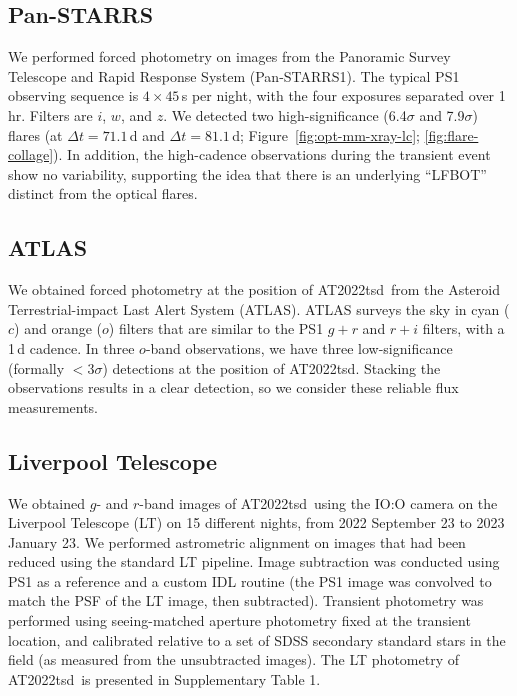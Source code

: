 \documentclass{nature_plusfigure}
\newcommand{\at}{AT2022tsd}
\begin{document}
\begin{methods}
\subsection{Pan-STARRS}
\label{sec:panstarrs}

We performed forced photometry on images from the Panoramic Survey Telescope and Rapid Response System (Pan-STARRS1\cite{Tonry2012,Chambers2016,Flewelling2020}).
The typical PS1 observing sequence is $4\times45$\,s per night, with the
four exposures separated over 1\,hr. Filters are $i$, $w$, and $z$\cite{Tonry2012}.
We detected two high-significance (6.4$\sigma$ and 7.9$\sigma$) flares (at $\Delta t=71.1$\,d and $\Delta t=81.1\,$d; Figure~\ref{fig:opt-mm-xray-lc}; \ref{fig:flare-collage}).
In addition, the high-cadence observations during the transient event show no variability, supporting the idea that there is an underlying ``LFBOT'' distinct from the optical flares.

\subsection{ATLAS}
\label{sec:atlas}

We obtained forced photometry at the position of \at\ from the Asteroid Terrestrial-impact Last Alert System (ATLAS\cite{Tonry2018,Smith2020,Shingles2021}).
ATLAS surveys the sky in cyan ($c$) and orange ($o$) filters that are similar to the PS1 $g+r$ and $r+i$ filters,
with a 1\,d cadence.
In three $o$-band observations, we have three low-significance (formally $<3\sigma$) detections at the position of \at.
Stacking the observations results in a clear detection, so we consider these reliable flux measurements.

\subsection{Liverpool Telescope}
\label{Methods: LT}

We obtained $g$- and $r$-band images of \at\ using the IO:O camera on the Liverpool Telescope\cite{Steele2004} (LT) on 15 different nights, from 2022 September 23 to 2023 January 23. We performed astrometric alignment on images that had been reduced using the standard LT pipeline.  Image subtraction was conducted using PS1 as a reference and a custom IDL routine (the PS1 image was convolved to match the PSF of the LT image, then subtracted).  Transient photometry was performed using seeing-matched aperture photometry fixed at the transient location, and calibrated relative to a set of SDSS secondary standard stars in the field (as measured from the unsubtracted images). The LT photometry of \at\ is presented in Supplementary Table 1.


\end{methods}
\end{document}

